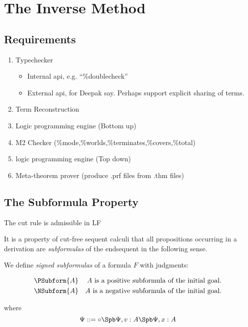 
\section{The Inverse Method}

\subsection{Requirements}

\begin{enumerate} 
\item Typechecker
  \begin{itemize} 
  \item Internal api, e.g. ``\%doublecheck''
  \item External api, for Deepak say.  Perhaps support explicit sharing of terms.
  \end{itemize} 
\item Term Reconstruction
\item Logic programming engine (Bottom up)
\item M2 Checker (\%mode,\%worlds,\%terminates,\%covers,\%total)
\item logic programming engine (Top down)
\item Meta-theorem prover (produce .prf files from .thm files)
\end{enumerate} 

\subsection{The Subformula Property}

\begin{Theorem} The cut rule is admissible in LF \end{Theorem} 

It is a property of cut-free sequent calculi that all propositions occurring
in a derivation are \emph{subformulas} of the endsequent in the following sense.

We define \emph{signed subformulas} of a formula $F$ with judgments:

\begin{align*} 
\PSubform{A} & & \mbox{$A$ is a positive subformula of the initial goal.}\\
\NSubform{A} & & \mbox{$A$ is a negative subformula of the initial goal.}
\end{align*} 

where 
$$\Psi ::= \circ \Spb \Psi, v:A \Spb \Psi, x:A$$

